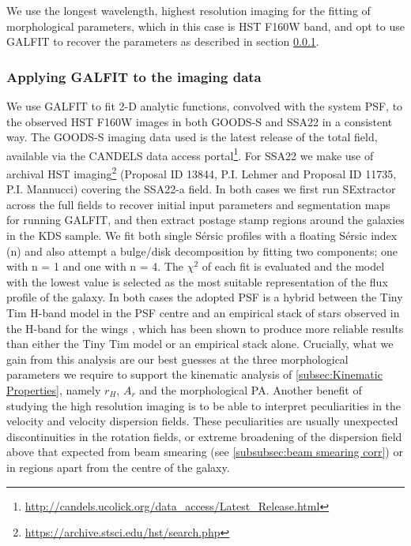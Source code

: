 \documentclass[a4paper,fleqn,usenatbib]{mn2e}
\newcommand{\Sers}{S\'{e}rsic }
\begin{document}
We use the longest wavelength, highest resolution imaging for the fitting of morphological parameters, which in this case is HST F160W band, and opt to use GALFIT \citep{Peng2010_galfit} to recover the parameters as described in section \ref{subsubsec:galfitting}.

\subsubsection{Applying GALFIT to the imaging data}\label{subsubsec:galfitting}
We use GALFIT to fit 2-D analytic functions, convolved with the system PSF, to the observed HST F160W images in both GOODS-S and SSA22 in a consistent way.
The GOODS-S imaging data used is the latest release of the total field, available via the CANDELS \citep{Grogin2011,Koekemoer2011} data access portal\footnote{\tiny{\url{http://candels.ucolick.org/data_access/Latest_Release.html}}}.
For SSA22 we make use of archival HST imaging\footnote{\tiny{\url{https://archive.stsci.edu/hst/search.php}}} (Proposal ID 13844, P.I. Lehmer and Proposal ID 11735, P.I. Mannucci) covering the SSA22-a field.
In both cases we first run SExtractor \citep{Bertin1996} across the full fields to recover initial input parameters and segmentation maps for running GALFIT, and then extract postage stamp regions around the galaxies in the KDS sample.
We fit both single \Sers profiles with a floating \Sers index (n) and also attempt a bulge/disk decomposition by fitting two components; one with n = 1 and one with n = 4.
The $\chi ^{2}$ of each fit is evaluated and the model with the lowest value is selected as the most suitable representation of the flux profile of the galaxy.
In both cases the adopted PSF is a hybrid between the Tiny Tim H-band model \citep{Krist2011} in the PSF centre and an empirical stack of stars observed in the H-band for the wings \citep{VanderWel2012}, which has been shown to produce more reliable results than either the Tiny Tim model or an empirical stack alone.
Crucially, what we gain from this analysis are our best guesses at the three morphological parameters we require to support the kinematic analysis of \cref{subsec:Kinematic Properties}, namely $r_{H}$, $A_{r}$ and the morphological PA.
Another benefit of studying the high resolution imaging is to be able to interpret peculiarities in the velocity and velocity dispersion fields.
These peculiarities are usually unexpected discontinuities in the rotation fields, or extreme broadening of the dispersion field above that expected from beam smearing (see \cref{subsubsec:beam smearing corr}) or in regions apart from the centre of the galaxy.
\end{document}
